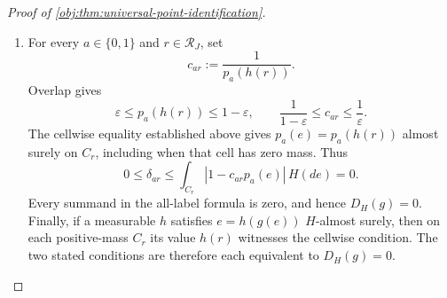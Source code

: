 \documentclass[11pt]{article}
\begin{document}
\begin{proof}[Proof of \cref{obj:thm:universal-point-identification}]
\begin{enumerate}
\item For every \(a\in\{0,1\}\) and \(r\in\mathcal R_J\), set
\[
c_{ar}:=\frac{1}{p_a(h(r))}.
\]
Overlap gives
\[
\varepsilon\leq p_a(h(r))\leq1-\varepsilon,
\qquad
\frac1{1-\varepsilon}\leq c_{ar}\leq\frac1\varepsilon.
\]
The cellwise equality established above gives \(p_a(e)=p_a(h(r))\) almost surely on \(C_r\), including when that cell has zero mass. Thus
\[
0\leq\delta_{ar}
\leq\int_{C_r}|1-c_{ar}p_a(e)|\,H(de)=0.
\]
Every summand in the all-label formula is zero, and hence \(D_H(g)=0\). Finally, if a measurable \(h\) satisfies \(e=h(g(e))\) \(H\)-almost surely, then on each positive-mass \(C_r\) its value \(h(r)\) witnesses the cellwise condition. The two stated conditions are therefore each equivalent to \(D_H(g)=0\). %
\end{enumerate}
\end{proof}
\end{document}
